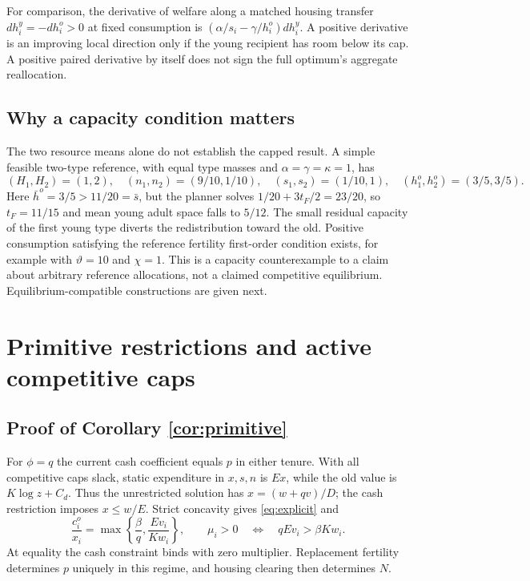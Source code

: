 \documentclass[11pt]{article}
\newcommand{\tht}{\vartheta}
\begin{document}
For comparison, the derivative of welfare along a matched housing transfer $dh_i^y=-dh_i^o>0$ at fixed consumption is
$(\alpha/s_i-\gamma/h_i^o)dh_i^y$. A positive derivative is an improving local direction only if the young recipient has room below its cap. A positive paired derivative by itself does not sign the full optimum's aggregate reallocation.

\subsection{Why a capacity condition matters}
The two resource means alone do not establish the capped result. A simple feasible two-type reference, with equal type masses and $\alpha=\gamma=\kappa=1$, has
\[
 (H_1,H_2)=(1,2),\quad(n_1,n_2)=(9/10,1/10),\quad
 (s_1,s_2)=(1/10,1),\quad(h_1^o,h_2^o)=(3/5,3/5).
\]
Here $\bar h^o=3/5>11/20=\bar s$, but the planner solves
$1/20+3t_F/2=23/20$, so $t_F=11/15$ and mean young adult space falls to $5/12$. The small residual capacity of the first young type diverts the redistribution toward the old. Positive consumption satisfying the reference fertility first-order condition exists, for example with $\tht=10$ and $\chi=1$. This is a capacity counterexample to a claim about arbitrary reference allocations, not a claimed competitive equilibrium. Equilibrium-compatible constructions are given next.

\section{Primitive restrictions and active competitive caps}\label{app:primitive}
\subsection{Proof of Corollary \ref{cor:primitive}}
For $\phi=q$ the current cash coefficient equals $p$ in either tenure. With all competitive caps slack, static expenditure in $x,s,n$ is $Ex$, while the old value is $K\log z+C_d$. Thus the unrestricted solution has $x=(w+qv)/D$; the cash restriction imposes $x\le w/E$. Strict concavity gives \eqref{eq:explicit} and
\begin{equation}
 \frac{c_i^o}{x_i}=\max\left\{\frac\beta q,\frac{Ev_i}{Kw_i}\right\},\qquad
 \mu_i>0\quad\Longleftrightarrow\quad qEv_i>\beta Kw_i.\label{eq:exactratio}
\end{equation}
At equality the cash constraint binds with zero multiplier. Replacement fertility determines $p$ uniquely in this regime, and housing clearing then determines $N$.
\end{document}
